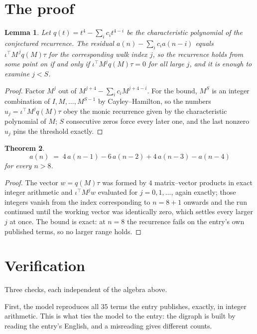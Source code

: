 \documentclass[11pt,a4paper]{article}
\theoremstyle{plain}
\newtheorem{theorem}{Theorem}
\newtheorem{lemma}[theorem]{Lemma}
\theoremstyle{definition}
\begin{document}
\section{The proof}

\begin{lemma}\label{lem:crit}
Let $q(t)=t^{4}-\sum_i c_it^{4-i}$ be the characteristic polynomial of the
conjectured recurrence. The residual $a(n)-\sum_ic_ia(n-i)$ equals
$\iota^{\!\top}M^{\,j}q(M)\tau$ for the corresponding walk index $j$, so the recurrence
holds from some point on if and only if $\iota^{\!\top}M^{j}q(M)\tau=0$ for all large $j$,
and it is enough to examine $j<S$.
\end{lemma}

\begin{proof}
Factor $M^{j}$ out of $M^{j+4}-\sum_ic_iM^{j+4-i}$. For the bound, $M^{S}$
is an integer combination of $I,M,\dots,M^{S-1}$ by Cayley--Hamilton, so the numbers
$u_j=\iota^{\!\top}M^{j}q(M)\tau$ obey the monic recurrence given by the characteristic
polynomial of $M$; $S$ consecutive zeros force every later one, and the last nonzero $u_j$
pins the threshold exactly.
\end{proof}

\begin{theorem}
\[
a(n)\;=\;4\,a(n-1) - 6\,a(n-2) + 4\,a(n-3) - a(n-4)
\]
for every $n>8$.
\end{theorem}

\begin{proof}
The vector $w=q(M)\tau$ was formed by $4$ matrix--vector products in exact integer
arithmetic and $\iota^{\!\top}M^{j}w$ evaluated for $j=0,1,\dots$, again exactly; those
integers vanish from the index corresponding to $n=8+1$ onwards and the run continued
until the working vector was identically zero, which settles every larger $j$ at once. The bound is exact: at $n=8$ the recurrence fails on the entry's own published terms, so no larger range holds.
\end{proof}

\section{Verification}

Three checks, each independent of the algebra above.

First, the model reproduces all $35$ terms the entry publishes, exactly, in integer
arithmetic. This is what ties the model to the entry: the digraph is built by reading the
entry's English, and a misreading gives different counts.
\end{document}
